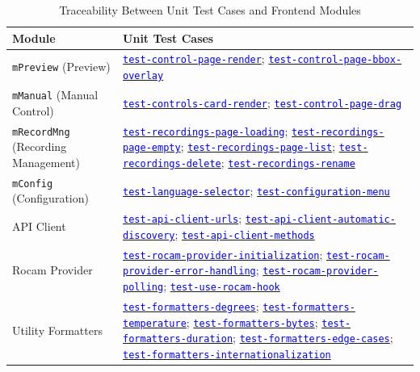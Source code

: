 \documentclass[12pt, titlepage]{article}
\newcommand{\mref}[1]{\texttt{#1}}
\newcommand{\tid}[1]{\hyperlink{tid:#1}{\textcolor{blue}{\texttt{#1}}}}
\begin{document}
\begin{table}[H]
  \centering
  \caption{Traceability Between Unit Test Cases and Frontend Modules}
  \label{TblUTM3}
  \begin{tabular}{|p{4.5cm}|p{10cm}|}
    \hline
    \textbf{Module}                          & \textbf{Unit Test Cases}                                                                                                                                                                                    \\
    \hline
    \mref{mPreview} (Preview)                & \tid{test-control-page-render}; \tid{test-control-page-bbox-overlay}                                                                                                                                        \\
    \hline
    \mref{mManual} (Manual Control)          & \tid{test-controls-card-render}; \tid{test-control-page-drag}                                                                                                                                               \\
    \hline
    \mref{mRecordMng} (Recording Management) & \tid{test-recordings-page-loading}; \tid{test-recordings-page-empty}; \tid{test-recordings-page-list}; \tid{test-recordings-delete}; \tid{test-recordings-rename}                                           \\
    \hline
    \mref{mConfig} (Configuration)           & \tid{test-language-selector}; \tid{test-configuration-menu}                                                                                                                                                 \\
    \hline
    API Client                               & \tid{test-api-client-urls}; \tid{test-api-client-automatic-discovery}; \tid{test-api-client-methods}                                                                                                        \\
    \hline
    Rocam Provider                           & \tid{test-rocam-provider-initialization}; \tid{test-rocam-provider-error-handling}; \tid{test-rocam-provider-polling}; \tid{test-use-rocam-hook}                                                            \\
    \hline
    Utility Formatters                       & \tid{test-formatters-degrees}; \tid{test-formatters-temperature}; \tid{test-formatters-bytes}; \tid{test-formatters-duration}; \tid{test-formatters-edge-cases}; \tid{test-formatters-internationalization} \\

\end{tabular}
\end{table}
\end{document}
